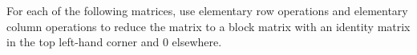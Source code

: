 \documentclass[answers]{exam}
\begin{document}
\begin{questions}
\question%
For each of the following matrices, use elementary row operations and elementary column operations to reduce the matrix to a block matrix with an identity matrix in the top left-hand corner and 0 elsewhere.

\end{questions}
\end{document}
